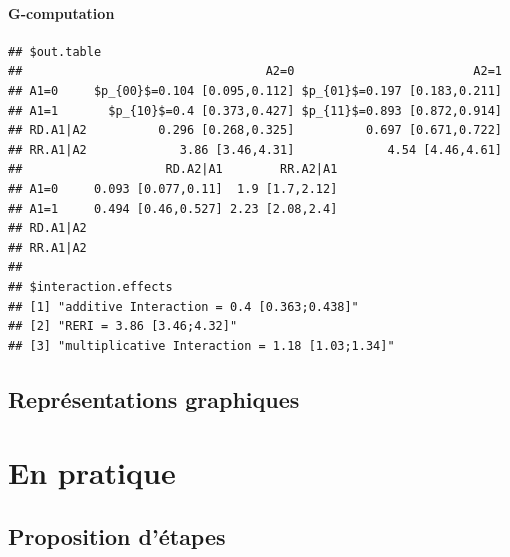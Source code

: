 \documentclass[
]{book}
\begin{document}
\hypertarget{g-computation}{%
\subsection*{G-computation}\label{g-computation}}

\begin{verbatim}
## $out.table
##                                  A2=0                         A2=1
## A1=0     $p_{00}$=0.104 [0.095,0.112] $p_{01}$=0.197 [0.183,0.211]
## A1=1       $p_{10}$=0.4 [0.373,0.427] $p_{11}$=0.893 [0.872,0.914]
## RD.A1|A2          0.296 [0.268,0.325]          0.697 [0.671,0.722]
## RR.A1|A2             3.86 [3.46,4.31]             4.54 [4.46,4.61]
##                    RD.A2|A1        RR.A2|A1
## A1=0     0.093 [0.077,0.11]  1.9 [1.7,2.12]
## A1=1     0.494 [0.46,0.527] 2.23 [2.08,2.4]
## RD.A1|A2                                   
## RR.A1|A2                                   
## 
## $interaction.effects
## [1] "additive Interaction = 0.4 [0.363;0.438]"     
## [2] "RERI = 3.86 [3.46;4.32]"                      
## [3] "multiplicative Interaction = 1.18 [1.03;1.34]"
\end{verbatim}

\hypertarget{graph}{%
\chapter{Représentations graphiques}\label{graph}}

\hypertarget{part-en-pratique}{%
\part{En pratique}\label{part-en-pratique}}

\hypertarget{proposition-duxe9tapes}{%
\chapter{Proposition d'étapes}\label{proposition-duxe9tapes}}
\end{document}
